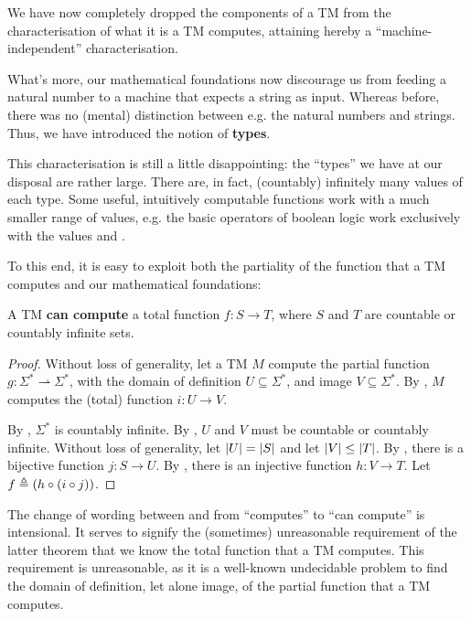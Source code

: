 \begin{remark} We have now completely dropped the components of a TM from the
characterisation of what it is a TM computes, attaining hereby a
``machine-independent'' characterisation.
\end{remark}

What's more, our mathematical foundations now discourage us from feeding a
natural number to a machine that expects a string as input. Whereas before,
there was no (mental) distinction between e.g. the natural numbers and strings.
Thus, we have introduced the notion of \textbf{types}.

This characterisation is still a little disappointing: the ``types'' we have at
our disposal are rather large. There are, in fact, (countably) infinitely many
values of each type. Some useful, intuitively computable functions work with a
much smaller range of values, e.g. the basic operators of boolean logic work
exclusively with the values \strue{} and \sfalse{}.

To this end, it is easy to exploit both the partiality of the function that a
TM computes and our mathematical foundations:

\begin{theorem} \label{thm:tm-can-compute} A TM \textbf{can compute} a total
function $f : S \rightarrow T$, where $S$ and $T$ are countable or countably
infinite sets. \end{theorem}

\begin{proof} Without loss of generality, let a TM $M$ compute the partial
function $g : \Sigma^* \rightharpoonup \Sigma^*$, with the domain of definition
$U \subseteq \Sigma^*$, and image $V \subseteq \Sigma ^*$. By
, $M$ computes the (total) function $i : U
\rightarrow V$.

By , $\Sigma^*$ is countably infinite.
By , $U$ and $V$ must be countable or
countably infinite. Without loss of generality, let $\mathopen{}\left|{U}\right|\mathclose{}=\mathopen{}\left|{S}\right|\mathclose{}$ and let
$\mathopen{}\left|{V}\right|\mathclose{}\leq\mathopen{}\left|{T}\right|\mathclose{}$. By , there is a bijective function $j
: S \rightarrow U$. By , there is an injective function $h : V
\rightarrow T$. Let $f \triangleq \mathopen{}\left({h \circ \mathopen{}\left({i \circ j}\right)\mathclose{}}\right)\mathclose{}$.\end{proof}

The change of wording between  and
 from ``computes'' to ``can compute'' is intensional. It
serves to signify the (sometimes) unreasonable requirement of the latter
theorem that we know the total function that a TM computes. This requirement is
unreasonable, as it is a well-known undecidable problem to find the domain of
definition, let alone image, of the partial function that a TM computes.

